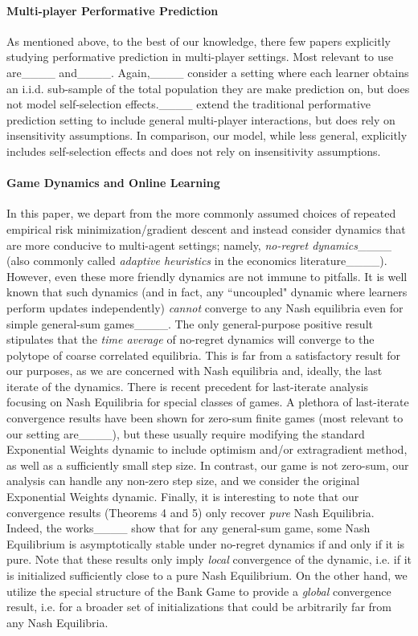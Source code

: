 \paragraph{Multi-player Performative Prediction} As mentioned above, to the best of our knowledge, there few papers explicitly studying performative prediction in multi-player settings. Most relevant to use are____ and____. Again,____ consider a setting where each learner obtains an i.i.d. sub-sample of the total population they are make prediction on, but does not model self-selection effects.____ extend the traditional performative prediction setting to include general multi-player interactions, but does rely on insensitivity assumptions. In comparison, our model, while less general, explicitly includes self-selection effects and does not rely on insensitivity assumptions.

\paragraph{Game Dynamics and Online Learning} In this paper, we depart from the more commonly assumed choices of repeated empirical risk minimization/gradient descent and instead consider dynamics that are more conducive to multi-agent settings; namely, \emph{no-regret dynamics}____ (also commonly called \emph{adaptive heuristics} in the economics literature____).
However, even these more friendly dynamics are not immune to pitfalls. It is well known that such dynamics (and in fact, any ``uncoupled" dynamic where learners perform updates independently) \emph{cannot} converge to any Nash equilibria even for simple general-sum games____.
The only general-purpose positive result stipulates that the \emph{time average} of no-regret dynamics will converge to the polytope of coarse correlated equilibria. 
This is far from a satisfactory result for our purposes, as we are concerned with Nash equilibria and, ideally, the last iterate of the dynamics.
There is recent precedent for last-iterate analysis focusing on Nash Equilibria for special classes of games.
A plethora of last-iterate convergence results have been shown for zero-sum finite games (most relevant to our setting are____), but these usually require modifying the standard Exponential Weights dynamic to include optimism and/or extragradient method, as well as a sufficiently small step size.
In contrast, our game is not zero-sum, our analysis can handle any non-zero step size, and we consider the original Exponential Weights dynamic.
Finally, it is interesting to note that our convergence results (Theorems 4 and 5) only recover \emph{pure} Nash Equilibria.
Indeed, the works____ show that for any general-sum game, some Nash Equilibrium is asymptotically stable under no-regret dynamics if and only if it is pure. Note that these results only imply \emph{local} convergence of the dynamic, i.e. if it is initialized sufficiently close to a pure Nash Equilibrium.
On the other hand, we utilize the special structure of the Bank Game to provide a \emph{global} convergence result, i.e. for a broader set of initializations that could be arbitrarily far from any Nash Equilibria.


%